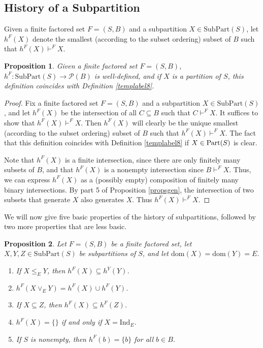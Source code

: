 \documentclass[authordate,onecolumn]{miri-tech-article}
\newtheorem{proposition}{Proposition}
\begin{document}
\subsection{History of a Subpartition}
\begin{definition}Given a finite factored set $F=(S,B)$ and a subpartition $X\in\text{SubPart}(S)$, let $h^F(X)$ denote the smallest (according to the subset ordering) subset of $B$ such that $h^F(X)\vdash^F X$.
\end{definition}
\begin{proposition}
Given a finite factored set $F=(S,B)$, $h^F:\text{SubPart}(S)\rightarrow \mathcal{P}(B)$ is well-defined, and if $X$ is a partition of $S$, this definition coincides with Definition \ref{templabel8}.
\end{proposition}
\begin{proof}
Fix a finite factored set $F=(S,B)$ and a subpartition $X\in\text{SubPart}(S)$, and let $h^F(X)$ be the intersection of all $C\subseteq B$ such that $C\vdash^F X$. It suffices to show that $h^F(X)\vdash^F X$. Then $h^F(X)$ will clearly be the unique smallest (according to the subset ordering) subset of $B$ such that $h^F(X)\vdash^F X$. The fact that this definition coincides with Definition \ref{templabel8} if $X\in \text{Part}(S)$ is clear.

Note that $h^F(X)$ is a finite intersection, since there are only finitely many subsets of $B$, and that $h^F(X)$ is a nonempty intersection since $B\vdash^F X$. Thus, we can express $h^F(X)$ as a (possibly empty) composition of finitely many binary intersections. By part 5 of Proposition \ref{propsgen}, the intersection of two subsets that generate $X$ also generates $X$. Thus $h^F(X)\vdash^F X$. 
\end{proof}
We will now give five basic properties of the history of subpartitions, followed by two more properties that are less basic.
\begin{proposition}
Let $F=(S,B)$ be a finite factored set, let $X,Y,Z\in \text{SubPart}(S)$ be subpartitions of $S$, and let $\text{dom}(X)=\text{dom}(Y)=E$.
\begin{enumerate}
    \item If $X\leq_E Y$, then $h^F(X)\subseteq h^Y(Y)$.
    \item $h^F(X\vee_E Y)=h^F(X)\cup h^F(Y)$.
    \item If $X\subseteq Z$, then $h^F(X)\subseteq h^F(Z)$.
    \item $h^F(X)=\{\}$ if and only if $X=\text{Ind}_E$.
    \item If $S$ is nonempty, then $h^F(b)=\{b\}$ for all $b\in B$.
\end{enumerate}
\end{proposition}
\end{document}
